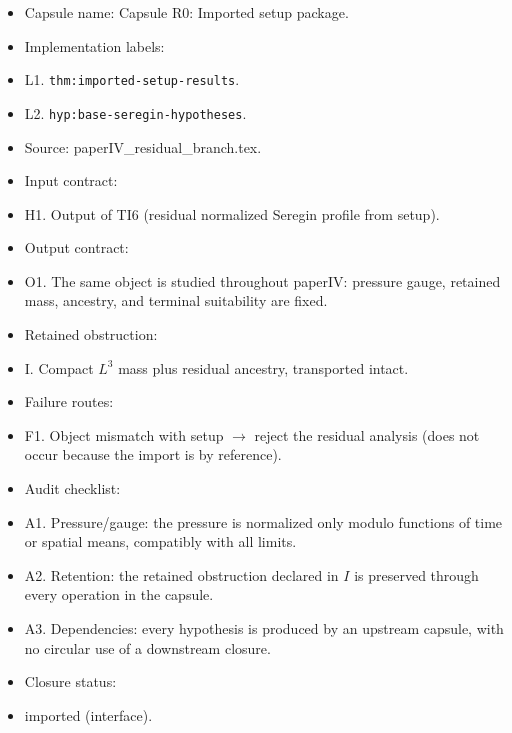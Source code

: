 \documentclass[11pt]{amsart}
\begin{document}
\begin{itemize}
  \item Capsule name: Capsule R0: Imported setup package.
  \item Implementation labels:
  \item L1. \texttt{thm:imported-setup-results}.
  \item L2. \texttt{hyp:base-seregin-hypotheses}.
  \item Source: paperIV\_residual\_branch.tex.
  \item Input contract:
  \item H1. Output of TI6 (residual normalized Seregin profile from setup).
  \item Output contract:
  \item O1. The same object is studied throughout paperIV: pressure gauge, retained mass, ancestry, and terminal suitability are fixed.
  \item Retained obstruction:
  \item I. Compact $L^3$ mass plus residual ancestry, transported intact.
  \item Failure routes:
  \item F1. Object mismatch with setup $\to$ reject the residual analysis (does not occur because the import is by reference).
  \item Audit checklist:
  \item A1. Pressure/gauge: the pressure is normalized only modulo functions of time or spatial means, compatibly with all limits.
  \item A2. Retention: the retained obstruction declared in $I$ is preserved through every operation in the capsule.
  \item A3. Dependencies: every hypothesis is produced by an upstream capsule, with no circular use of a downstream closure.
  \item Closure status:
  \item imported (interface).
\end{itemize}
\end{document}
